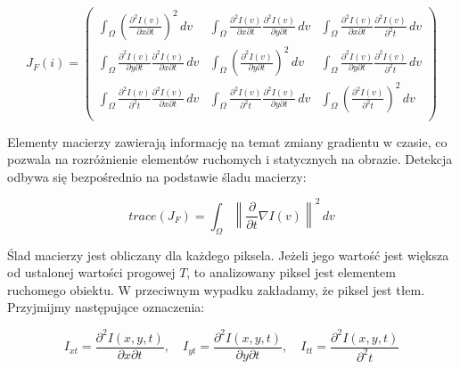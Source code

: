 \documentclass[10pt,a4paper]{article}
\begin{document}
\begin{equation}
			J_F(i) = 
			\begin{pmatrix}
			\int_\Omega \left(\frac{\partial^2 I(v)}{\partial x\partial t}\right)^2\,dv & 
			\int_\Omega \frac{\partial^2 I(v)}{\partial x\partial t}\frac{\partial^2 I(v)}{\partial y 							\partial t}\,dv & 
			\int_\Omega \frac{\partial^2 I(v)}{\partial x\partial t}\frac{\partial^2 I(v)}{\partial^2 t}						\,dv	\\
			
			\int_\Omega \frac{\partial^2 I(v)}{\partial y\partial t}\frac{\partial^2 I(v)}{\partial x 							\partial t}\,dv & 
			\int_\Omega \left(\frac{\partial^2 I(v)}{\partial y\partial t}\right)^2\,dv & 
			\int_\Omega \frac{\partial^2 I(v)}{\partial y\partial t}\frac{\partial^2 I(v)}{\partial^2 t}						\,dv \\
			
			\int_\Omega \frac{\partial^2 I(v)}{\partial^2 t}\frac{\partial^2 I(v)}{\partial x\partial t}						\,dv & 
			\int_\Omega \frac{\partial^2 I(v)}{\partial^2 t}\frac{\partial^2 I(v)}{\partial y\partial t}						\,dv & 
			\int_\Omega \left(\frac{\partial^2 I(v)}{\partial^2 t}\right)^2\,dv \\		
			\end{pmatrix}
\label{equ:fluxTensorMatrix}
\end{equation}

Elementy macierzy zawierają informację na temat zmiany gradientu w czasie, co pozwala na rozróżnienie elementów ruchomych i statycznych na obrazie. Detekcja odbywa się bezpośrednio na podstawie śladu macierzy: 

\begin{equation}
	trace(J_F) = \int_\Omega \left\lVert \frac{\partial}{\partial t}\nabla I(v) \right\rVert^2\,dv
\label{equ:fluxTrace}
\end{equation}

Ślad macierzy jest obliczany dla każdego piksela. Jeżeli jego wartość jest większa od ustalonej wartości progowej $T$, to analizowany piksel jest elementem ruchomego obiektu. W przeciwnym wypadku zakładamy, że piksel jest tłem.
Przyjmijmy następujące oznaczenia:

\begin{equation}
	I_{xt}=\frac{\partial^2I(x,y,t)}{\partial x\partial t},\quad I_{yt}=\frac{\partial^2I(x,y,t)}{\partial y			\partial t},\quad I_{tt}=\frac{\partial^2I(x,y,t)}{\partial^2 t}	
\label{equ:fluxComponents}
\end{equation}
\end{document}
